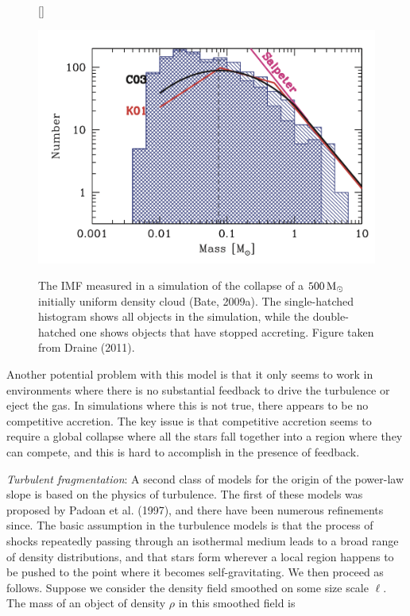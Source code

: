 \documentclass[a4paper,10pt]{article}
\begin{document}
\begin{figure}[t]
    [\FBwidth]
    {\caption{\footnotesize{The IMF measured in a simulation of the collapse of a $500\,{\rm M_\odot}$ initially uniform density cloud (Bate, 2009a). The single-hatched histogram shows all objects in the simulation, while the double-hatched one shows objects that have stopped accreting. Figure taken from Draine (2011).}}
    \label{fig:imf}}
    {\includegraphics[width=12cm]{figures/IMF.png}}
\end{figure}

{\noindent}Another potential problem with this model is that it only seems to work in environments where there is no substantial feedback to drive the turbulence or eject the gas. In simulations where this is not true, there appears to be no competitive accretion. The key issue is that competitive accretion seems to require a global collapse where all the stars fall together into a region where they can compete, and this is hard to accomplish in the presence of feedback.

{\noindent}\textit{Turbulent fragmentation}: A second class of models for the origin of the power-law slope is based on the physics of turbulence. The first of these models was proposed by Padoan et al. (1997), and there have been numerous refinements since. The basic assumption in the turbulence models is that the process of shocks repeatedly passing through an isothermal medium leads to a broad range of density distributions, and that stars form wherever a local region happens to be pushed to the point where it becomes self-gravitating. We then proceed as follows. Suppose we consider the density field smoothed on some size scale $\ell$. The mass of an object of density $\rho$ in this smoothed field is
\end{document}
